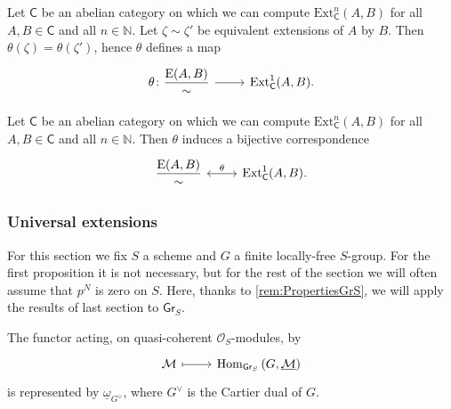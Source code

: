 \begin{lem}
	Let $\mathsf{C}$ be an abelian category on which we
	can compute $\mathrm{Ext}^n_{\mathsf{C}}(A,B)$
	for all $A, B \in \mathsf{C}$ and all $n \in \mathbb{N}$.
	Let $\zeta \sim \zeta'$ be equivalent extensions of
	$A$ by $B$.
	Then $\theta(\zeta) = \theta(\zeta')$, hence $\theta$
	defines a map
	\begin{equation*}
	\begin{tikzcd}[row sep = 0ex
		,/tikz/column 1/.append style={anchor=base east}
		,/tikz/column 2/.append style={anchor=base west}]
		\theta\colon \displaystyle{\frac{\mathrm{E}(A,B)}{\sim}} 
		\arrow[r, "", rightarrow] &
		\mathrm{Ext}^1_{\mathsf{C}}(A,B)
	.\end{tikzcd}
	\end{equation*} 
\end{lem} 


\begin{thm}\label{thm:CorrExt}
	Let $\mathsf{C}$ be an abelian category on which we
	can compute $\mathrm{Ext}^n_{\mathsf{C}}(A,B)$
	for all $A, B \in \mathsf{C}$ and all $n \in \mathbb{N}$.
	Then $\theta$ induces a bijective correspondence
	\begin{equation*}
	\begin{tikzcd}[row sep = 0ex
		,/tikz/column 1/.append style={anchor=base east}
		,/tikz/column 2/.append style={anchor=base west}]
		\displaystyle{\frac{\mathrm{E}(A,B)}{\sim}} 
		\arrow[r, "\theta", leftrightarrow] &
		\mathrm{Ext}^1_{\mathsf{C}}(A,B)
	.\end{tikzcd}
	\end{equation*} 
\end{thm} 



\subsubsection{Universal extensions}
For this section we fix $S$ a scheme and $G$ a finite locally-free $S$-group.
For the first proposition it is not necessary, but for the rest of the section we will often
assume that $p^N$ is zero on $S$.
Here, thanks to \cref{rem:PropertiesGrS},
we will apply the results of last section to $\mathsf{Gr}_S$.


\begin{prop}\label{prop:ReprhM}
	The functor acting, on quasi-coherent $\mathcal{O}_{ S }$-modules, by
	\begin{equation*}
	\begin{tikzcd}[row sep = 0ex
		,/tikz/column 1/.append style={anchor=base east}
		,/tikz/column 2/.append style={anchor=base west}]
		\mathcal{M} \arrow[r, "", mapsto] & 
		\mathrm{Hom}_{ \mathsf{Gr}_S } \left( G, \underline{\mathcal{M}} \right)
	\end{tikzcd}
	\end{equation*} 
	is represented by $\underline{\omega}_{G^\vee}$, where $G^\vee$ is
	the Cartier dual of $G$.
\end{prop}


